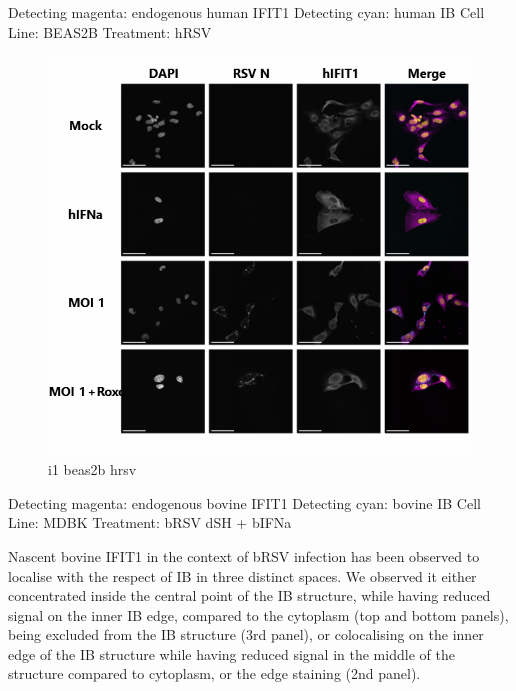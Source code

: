 Detecting magenta: endogenous human IFIT1 \newline
Detecting cyan: human IB \newline
Cell Line: BEAS2B \newline
Treatment: hRSV \newline

\begin{figure}
    \centering
    \includegraphics[width=1\linewidth]{09. Chapter 4/Figs/02. Infection/02. beas2b i1.png}
    \caption[i1 beas2b hrsv]{i1 beas2b hrsv}
    \label{fig:i1 beas2b hrsv}
\end{figure}

Detecting magenta: endogenous bovine IFIT1 \newline
Detecting cyan: bovine IB \newline
Cell Line: MDBK \newline
Treatment: bRSV dSH + bIFNa \newline

Nascent bovine IFIT1 in the context of bRSV infection has been observed to localise with the respect of IB in three distinct spaces. We observed it either concentrated inside the central point of the IB structure, while having reduced signal on the inner IB edge, compared to the cytoplasm (top and bottom panels), being excluded from the IB structure (3rd panel), or colocalising on the inner edge of the IB structure while having reduced signal in the middle of the structure compared to cytoplasm, or the edge staining (2nd panel).

